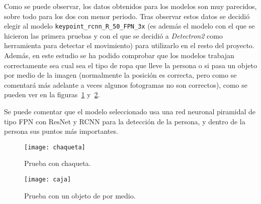 \begin{table}[h]
	\centering
\caption{Tabla con el estudio de los modelos de posición ordenado por ratio.}
\label{tab:modelos}
\end{table}

Como se puede observar, los datos obtenidos para los modelos son muy parecidos, sobre todo para los dos con menor periodo. Tras observar estos datos se decidió elegir al modelo \texttt{keypoint\_rcnn\_R\_50\_FPN\_3x} (es además el modelo con el que se hicieron las primera pruebas y con el que se decidió a \textit{Detectron2} como herramienta para detectar el movimiento) para utilizarlo en el resto del proyecto. Además, en este estudio se ha podido comprobar que los modelos trabajan correctamente sea cual sea el tipo de ropa que lleve la persona o si pasa un objeto por medio de la imagen (normalmente la posición es correcta, pero como se comentará más adelante a veces algunos fotogramas no son correctos), como se pueden ver en la figuras~\ref{fig:chaqueta} y~\ref{fig:caja}.

Se puede comentar que el modelo seleccionado usa una red neuronal piramidal de tipo FPN con ResNet y RCNN para la detección de la persona, y dentro de la persona sus puntos más importantes.

\begin{figure}[h]
	\centering
	\texttt{[image: chaqueta]}
	\caption{Prueba con chaqueta.}
	\label{fig:chaqueta}
\end{figure}

\begin{figure}[h]
	\centering
	\texttt{[image: caja]}
	\caption{Prueba con un objeto de por medio.}
	\label{fig:caja}
\end{figure}


